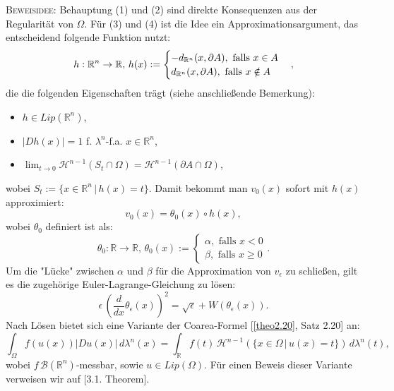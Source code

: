 \textsc{Beweisidee:} Behauptung (1) und (2) sind direkte Konsequenzen aus der Regularität von \(\Omega\). Für (3) und (4) ist die Idee ein Approximationsargument, das entscheidend folgende Funktion nutzt:
\begin{equation}{\label{eq3.30}}
    h:\mathbb{R}^n \to \mathbb{R}, \, h(x) := \begin{cases}
        -d_{\mathbb{R}^n}(x, \partial A), \text{ falls }x \in A \\
        d_{\mathbb{R}^n}(x, \partial A), \text{ falls }x \notin A
    \end{cases},
\end{equation}
die die folgenden Eigenschaften trägt (siehe anschließende Bemerkung):
\begin{itemize}
    \item \(h \in Lip(\mathbb{R}^n)\),
    \item \(|Dh(x)| = 1 \) f. \(\lambda^n\)-f.a. \(x \in \mathbb{R}^n\),
    \item \(\lim_{t \to 0} \mathcal{H}^{n-1} (S_t \cap \Omega) = \mathcal{H}^{n-1}(\partial A \cap \Omega)\),
\end{itemize}
wobei \(S_t := \{x \in \mathbb{R}^n \, | \, h(x) = t\}\). Damit bekommt man \(v_0(x)\) sofort mit \(h(x)\) approximiert:
\begin{equation}
    v_0(x) = \theta_0(x) \circ h(x),
\end{equation}
wobei \(\theta_0\) definiert ist als:
\begin{equation}
    \theta_0 : \mathbb{R} \to \mathbb{R}, \, \theta_0(x) := \begin{cases}
        \alpha, \text{ falls }x<0 \\
        \beta, \text{ falls }x \geq 0
    \end{cases}.    
\end{equation}
Um die "Lücke" zwischen \(\alpha\) und \(\beta\) für die Approximation von \(v_{\epsilon}\) zu schließen, gilt es die zugehörige Euler-Lagrange-Gleichung zu lösen:
\begin{equation}
    \epsilon \, (\frac{d}{dx}\theta_{\epsilon}(x))^2 = \sqrt{\epsilon} + W(\theta_{\epsilon}(x)).
\end{equation}
Nach Lösen bietet sich eine Variante der Coarea-Formel [\ref{theo2.20}, Satz 2.20] an:
\begin{equation}
    \int_{\Omega} f(u(x)) |Du(x)| \, d\lambda^n(x) = \int_{\mathbb{R}} f(t) \, \mathcal{H}^{n-1}(\{x \in \Omega \, | \, u(x) = t\}) \, d\lambda^n(t),
\end{equation}
wobei \(f \, \mathcal{B}(\mathbb{R}^n)\)-messbar, sowie \(u \in Lip(\Omega)\). Für einen Beweis dieser Variante verweisen wir auf \cite{federer1959curvature}[3.1. Theorem]. \QEDB

